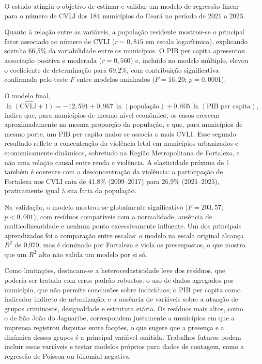 \documentclass[12pt,a4paper]{article}
\begin{document}
	O estudo atingiu o objetivo de estimar e validar um modelo de regressão linear para o número de CVLI dos 184 municípios do Ceará no período de 2021 a 2023.
	
	Quanto à relação entre as variáveis, a população residente mostrou-se o principal fator associado ao número de CVLI ($r = 0{,}815$ em escala logarítmica), explicando sozinha 66,5\% da variabilidade entre os municípios. O PIB per capita apresentou associação positiva e moderada ($r = 0{,}560$) e, incluído no modelo múltiplo, elevou o coeficiente de determinação para 69,2\%, com contribuição significativa confirmada pelo teste $F$ entre modelos aninhados ($F = 16{,}20$; $p = 0{,}0001$).
	
	O modelo final,
	\[
	\widehat{\ln(\text{CVLI}+1)} = -12{,}591 + 0{,}967\,\ln(\text{população}) + 0{,}605\,\ln(\text{PIB per capita}),
	\]
	indica que, para municípios de mesmo nível econômico, os casos crescem aproximadamente na mesma proporção da população, e que, para municípios de mesmo porte, um PIB per capita maior se associa a mais CVLI. Esse segundo resultado reflete a concentração da violência letal em municípios urbanizados e economicamente dinâmicos, sobretudo na Região Metropolitana de Fortaleza, e não uma relação causal entre renda e violência. A elasticidade próxima de 1 também é coerente com a desconcentração da violência: a participação de Fortaleza nos CVLI caiu de 41,8\% (2009--2017) para 26,9\% (2021--2023), praticamente igual à sua fatia da população.
	
	Na validação, o modelo mostrou-se globalmente significativo ($F = 203{,}57$; $p < 0{,}001$), com resíduos compatíveis com a normalidade, ausência de multicolinearidade e nenhum ponto excessivamente influente. Um dos principais aprendizados foi a comparação entre escalas: o modelo na escala original alcança $R^2$ de 0,970, mas é dominado por Fortaleza e viola os pressupostos, o que mostra que um $R^2$ alto não valida um modelo por si só.
	
	Como limitações, destacam-se a heterocedasticidade leve dos resíduos, que poderia ser tratada com erros padrão robustos; o uso de dados agregados por município, que não permite conclusões sobre indivíduos; o PIB per capita como indicador indireto de urbanização; e a ausência de variáveis sobre a atuação de grupos criminosos, desigualdade e estrutura etária. Os resíduos mais altos, como o de São João do Jaguaribe, correspondem justamente a municípios em que a imprensa registrou disputas entre facções, o que sugere que a presença e a dinâmica desses grupos é a principal variável omitida. Trabalhos futuros podem incluir essas variáveis e testar modelos próprios para dados de contagem, como a regressão de Poisson ou binomial negativa.
	
\end{document}
